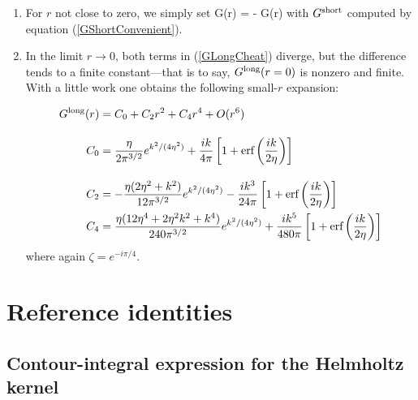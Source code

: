 \documentclass[letterpaper]{article}
\newcommand{\erf}{\text{erf}}
\begin{document}
\begin{enumerate}

\item
For $r$ not close to zero, we simply set
{G(r) =  - G(r)}
with $G^{\hbox{\scriptsize{short}}}$ computed by equation (\ref{GShortConvenient}).

\item
In the limit $r\to 0$, both terms in (\ref{GLongCheat}) 
diverge, but the difference tends to a finite constant---that
is to say, $G^{\hbox{\scriptsize{long}}}(r=0)$ is nonzero and finite. With a little
work one obtains the following small-$r$ expansion:

\begin{align*}
  G\sups{long}(r)
&= C_0 + C_2 r^2 + C_4r^4 + O(r^6)
\\[10pt]
C_0 &= \frac{\eta}{2\pi^{3/2}} e^{k^2/(4\eta^2)}
       + \frac{ik}{4\pi}
         \left[1 + \erf\left( \frac{ik}{2\eta}\right) \right]
\\[10pt]
C_2 &= -\frac{\eta (2\eta^2 + k^2)}{12\pi^{3/2}}
            e^{k^2/(4\eta^2)}
       -\frac{ik^3}{24\pi}
         \left[1 + \erf\left( \frac{ik}{2\eta}\right) \right]
\\
C_4 &= \frac{\eta (12\eta^4 + 2\eta^2 k^2 + k^4)}{240\pi^{3/2}}
            e^{k^2/(4\eta^2)}
       +\frac{ik^5}{480\pi}
         \left[1 + \erf\left( \frac{ik}{2\eta}\right) \right]
\end{align*}
where again $\zeta=e^{-i\pi/4}.$

\end{enumerate}

\section{Reference identities}

\subsection*{Contour-integral expression for the Helmholtz kernel}
\end{document}
